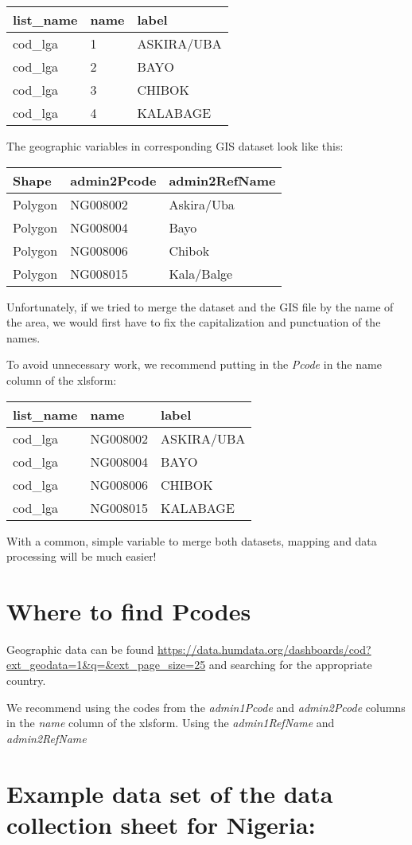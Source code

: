 \documentclass[
]{book}
\begin{document}
\begin{longtable}[]{@{}lll@{}}
\toprule
list\_name & name & label\tabularnewline
\midrule
\endhead
cod\_lga & 1 & ASKIRA/UBA\tabularnewline
cod\_lga & 2 & BAYO\tabularnewline
cod\_lga & 3 & CHIBOK\tabularnewline
cod\_lga & 4 & KALABAGE\tabularnewline
\bottomrule
\end{longtable}

The geographic variables in corresponding GIS dataset look like this:

\begin{longtable}[]{@{}lll@{}}
\toprule
Shape & admin2Pcode & admin2RefName\tabularnewline
\midrule
\endhead
Polygon & NG008002 & Askira/Uba\tabularnewline
Polygon & NG008004 & Bayo\tabularnewline
Polygon & NG008006 & Chibok\tabularnewline
Polygon & NG008015 & Kala/Balge\tabularnewline
\bottomrule
\end{longtable}

Unfortunately, if we tried to merge the dataset and the GIS file by the name of the area, we would first have to fix the capitalization and punctuation of the names.

To avoid unnecessary work, we recommend putting in the \emph{Pcode} in the name column of the xlsform:

\begin{longtable}[]{@{}lll@{}}
\toprule
list\_name & name & label\tabularnewline
\midrule
\endhead
cod\_lga & NG008002 & ASKIRA/UBA\tabularnewline
cod\_lga & NG008004 & BAYO\tabularnewline
cod\_lga & NG008006 & CHIBOK\tabularnewline
cod\_lga & NG008015 & KALABAGE\tabularnewline
\bottomrule
\end{longtable}

With a common, simple variable to merge both datasets, mapping and data processing will be much easier!

\hypertarget{where-to-find-pcodes}{%
\section{Where to find Pcodes}\label{where-to-find-pcodes}}

Geographic data can be found \url{https://data.humdata.org/dashboards/cod?ext_geodata=1\&q=\&ext_page_size=25} and searching for the appropriate country.

We recommend using the codes from the \emph{admin1Pcode} and \emph{admin2Pcode} columns in the \emph{name} column of the xlsform. Using the \emph{admin1RefName} and \emph{admin2RefName}

\hypertarget{example-data-set-of-the-data-collection-sheet-for-nigeria}{%
\section{Example data set of the data collection sheet for Nigeria:}\label{example-data-set-of-the-data-collection-sheet-for-nigeria}}
\end{document}
